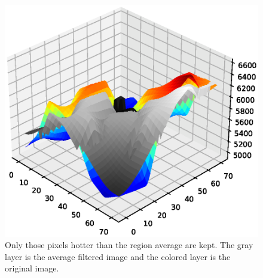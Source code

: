\begin{figure}
  \centering
  \includegraphics[width=\textwidth]{figures/detect_filterthres.eps}
  \caption{Only those pixels hotter than the region average are kept. The gray layer is the average filtered image and the colored layer is the original image.}\label{fig:detection3d}
\end{figure}

